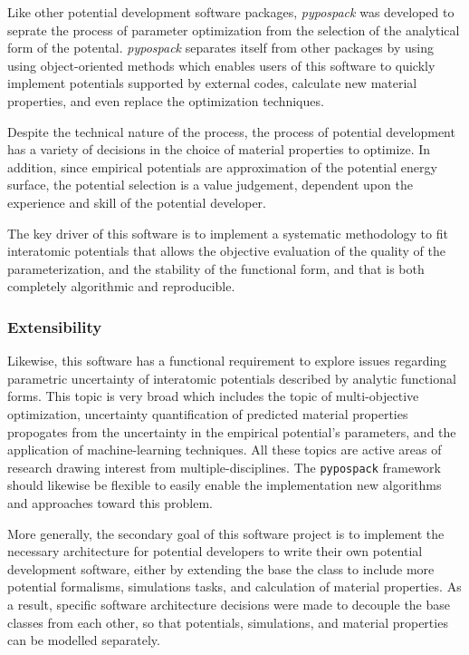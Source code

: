 Like other potential development software packages, \emph{pypospack} was developed to seprate the process of parameter optimization from the selection of the analytical form of the potental.  \emph{pypospack} separates itself from other packages by using using object-oriented methods which enables users of this software to quickly implement potentials supported by external codes, calculate new material properties, and even replace the optimization techniques.

Despite the technical nature of the process, the process of potential development has a variety of decisions in the choice of material properties to optimize.  In addition, since empirical potentials are approximation of the potential energy surface, the potential selection is a value judgement, dependent upon the experience and skill of the potential developer.

The key driver of this software is to implement a systematic methodology to fit interatomic potentials that allows the objective evaluation of the quality of the parameterization, and the stability of the functional form, and that is both completely algorithmic and reproducible.

\subsubsection{Extensibility}

Likewise, this software has a functional requirement to explore issues regarding parametric uncertainty of interatomic potentials described by analytic functional forms.
This topic is very broad which includes the topic of multi-objective optimization, uncertainty quantification of predicted material properties propogates from the uncertainty in the empirical potential's parameters, and the application of machine-learning techniques.
All these topics are active areas of research drawing interest from multiple-disciplines.  The \verb|pypospack| framework should likewise be flexible to easily enable the implementation new algorithms and approaches toward this problem.

More generally, the secondary goal of this software project is to implement the necessary architecture for potential developers to write their own potential development software, either by extending the base the class to include more potential formalisms, simulations tasks, and calculation of material properties.  As a result, specific software architecture decisions were made to decouple the base classes from each other, so that potentials, simulations, and material properties can be modelled separately.

